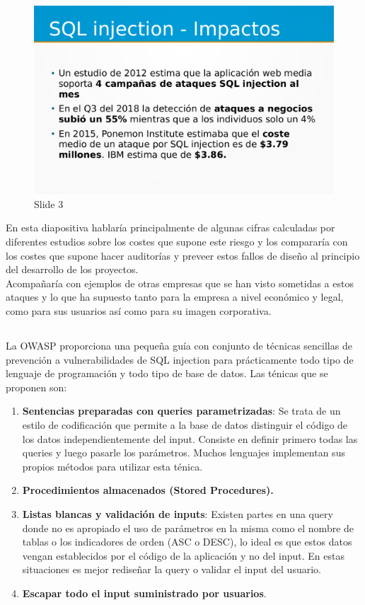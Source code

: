 \documentclass[a4paper,oneside]{article}
\begin{document}
\newpage
\begin{figure}[h!]
  \centering
  \includegraphics[scale=0.3]{images/3.png}
  \caption{Slide 3}
  \label{fig:3}
\end{figure}

En esta diapositiva hablaría principalmente de algunas cifras calculadas por diferentes estudios sobre los costes que supone este riesgo y los compararía con los costes que supone hacer auditorías y preveer estos fallos de diseño al principio del desarrollo de los proyectos.\\
Acompañaría con ejemplos de otras empresas que se han visto sometidas a estos ataques y lo que ha supuesto tanto para la empresa a nivel económico y legal, como para sus usuarios así como para su imagen corporativa.

\subsection{}
La OWASP proporciona una pequeña guía con conjunto de técnicas sencillas de prevención a vulnerabilidades de SQL injection \cite{sqliprev} para prácticamente todo tipo de lenguaje de programación y todo tipo de base de datos. Las ténicas que se proponen son:

\begin{enumerate}
\item \textbf{Sentencias preparadas con queries parametrizadas}: Se trata de un estilo de codificación que permite a la base de datos distinguir el código de los datos independientemente del input. Consiste en definir primero todas las queries y luego pasarle los parámetros. Muchos lenguajes implementan sus propios métodos para utilizar esta ténica.
\item \textbf{Procedimientos almacenados (Stored Procedures).}
\item \textbf{Listas blancas y validación de inputs}: Existen partes en una query donde no es apropiado el uso de parámetros en la misma como el nombre de tablas o los indicadores de orden (ASC o DESC), lo ideal es que estos datos vengan establecidos por el código de la aplicación y no del input. En estas situaciones es mejor rediseñar la query o validar el input del usuario.
\item \textbf{Escapar todo el input suministrado por usuarios}.
\end{enumerate}
\end{document}
